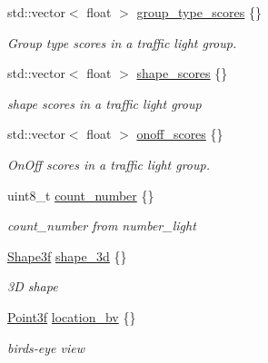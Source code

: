 \begin{DoxyCompactItemize}
std\+::vector$<$ float $>$ \hyperlink{structmaf__perception__interface_1_1PhysicalTrafficLightMultiFrame_a1d156028c6d568043b4b38b897e7632d}{group\+\_\+type\+\_\+scores} \{\}
\begin{DoxyCompactList}\small\item\em Group type scores in a traffic light group. \end{DoxyCompactList}\item 
std\+::vector$<$ float $>$ \hyperlink{structmaf__perception__interface_1_1PhysicalTrafficLightMultiFrame_afc48c5d93d73308e606af492a9793548}{shape\+\_\+scores} \{\}
\begin{DoxyCompactList}\small\item\em shape scores in a traffic light group \end{DoxyCompactList}\item 
std\+::vector$<$ float $>$ \hyperlink{structmaf__perception__interface_1_1PhysicalTrafficLightMultiFrame_aa84f438724bf3b143401085a081a9688}{onoff\+\_\+scores} \{\}
\begin{DoxyCompactList}\small\item\em On\+Off scores in a traffic light group. \end{DoxyCompactList}\item 
uint8\+\_\+t \hyperlink{structmaf__perception__interface_1_1PhysicalTrafficLightMultiFrame_ac039eb3129f09606db3d0afe224c1ded}{count\+\_\+number} \{\}
\begin{DoxyCompactList}\small\item\em count\+\_\+number from number\+\_\+light \end{DoxyCompactList}\item 
\hyperlink{structmaf__perception__interface_1_1Shape3f}{Shape3f} \hyperlink{structmaf__perception__interface_1_1PhysicalTrafficLightMultiFrame_ac99fac6b39d726c86839689b614b3f1f}{shape\+\_\+3d} \{\}
\begin{DoxyCompactList}\small\item\em 3D shape \end{DoxyCompactList}\item 
\hyperlink{structmaf__perception__interface_1_1Point3f}{Point3f} \hyperlink{structmaf__perception__interface_1_1PhysicalTrafficLightMultiFrame_a6c40c4c3d75cf9d5a02c158a8a92478c}{location\+\_\+bv} \{\}
\begin{DoxyCompactList}\small\item\em bird\textquotesingle{}s-\/eye view \end{DoxyCompactList}\item 

\end{DoxyCompactItemize}

